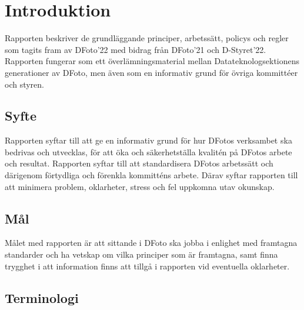\section{Introduktion}    
Rapporten beskriver de grundläggande principer, arbetssätt, policys och regler som tagits fram av DFoto'22 med bidrag från DFoto'21 och D-Styret'22. Rapporten fungerar som ett överlämningsmaterial mellan Datateknologsektionens generationer av DFoto, men även som en informativ grund för övriga kommittéer och styren.




\subsection{Syfte}
Rapporten syftar till att ge en informativ grund för hur DFotos verksambet ska bedrivas och utvecklas, för att öka och säkerhetställa kvalitén på DFotos arbete och resultat. Rapporten syftar till att standardisera DFotos arbetssätt och därigenom förtydliga och förenkla kommitténs arbete. Därav syftar rapporten till att minimera problem, oklarheter, stress och fel uppkomna utav okunskap. 

\subsection{Mål}
Målet med rapporten är att sittande i DFoto ska jobba i enlighet med framtagna standarder och ha vetskap om vilka principer som är framtagna, samt finna trygghet i att information finns att tillgå i rapporten vid eventuella oklarheter. 

\subsection{Terminologi}
